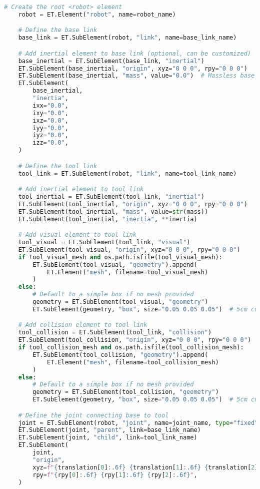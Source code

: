 \begin{lstlisting}[language=python, caption=\raggedright{calibration/sensor\_calibration.py}, frame=single]
    # Create the root <robot> element
    robot = ET.Element("robot", name=robot_name)

    # Define the base link
    base_link = ET.SubElement(robot, "link", name=base_link_name)

    # Add inertial element to base link (optional, can be customized)
    base_inertial = ET.SubElement(base_link, "inertial")
    ET.SubElement(base_inertial, "origin", xyz="0 0 0", rpy="0 0 0")
    ET.SubElement(base_inertial, "mass", value="0.0")  # Massless base
    ET.SubElement(
        base_inertial,
        "inertia",
        ixx="0.0",
        ixy="0.0",
        ixz="0.0",
        iyy="0.0",
        iyz="0.0",
        izz="0.0",
    )

    # Define the tool link
    tool_link = ET.SubElement(robot, "link", name=tool_link_name)

    # Add inertial element to tool link
    tool_inertial = ET.SubElement(tool_link, "inertial")
    ET.SubElement(tool_inertial, "origin", xyz="0 0 0", rpy="0 0 0")
    ET.SubElement(tool_inertial, "mass", value=str(mass))
    ET.SubElement(tool_inertial, "inertia", **inertia)

    # Add visual element to tool link
    tool_visual = ET.SubElement(tool_link, "visual")
    ET.SubElement(tool_visual, "origin", xyz="0 0 0", rpy="0 0 0")
    if tool_visual_mesh and os.path.isfile(tool_visual_mesh):
        ET.SubElement(tool_visual, "geometry").append(
            ET.Element("mesh", filename=tool_visual_mesh)
        )
    else:
        # Default to a simple box if no mesh provided
        geometry = ET.SubElement(tool_visual, "geometry")
        ET.SubElement(geometry, "box", size="0.05 0.05 0.05")  # 5cm cube

    # Add collision element to tool link
    tool_collision = ET.SubElement(tool_link, "collision")
    ET.SubElement(tool_collision, "origin", xyz="0 0 0", rpy="0 0 0")
    if tool_collision_mesh and os.path.isfile(tool_collision_mesh):
        ET.SubElement(tool_collision, "geometry").append(
            ET.Element("mesh", filename=tool_collision_mesh)
        )
    else:
        # Default to a simple box if no mesh provided
        geometry = ET.SubElement(tool_collision, "geometry")
        ET.SubElement(geometry, "box", size="0.05 0.05 0.05")  # 5cm cube

    # Define the joint connecting base to tool
    joint = ET.SubElement(robot, "joint", name=joint_name, type="fixed")
    ET.SubElement(joint, "parent", link=base_link_name)
    ET.SubElement(joint, "child", link=tool_link_name)
    ET.SubElement(
        joint,
        "origin",
        xyz=f"{translation[0]:.6f} {translation[1]:.6f} {translation[2]:.6f}",
        rpy=f"{rpy[0]:.6f} {rpy[1]:.6f} {rpy[2]:.6f}",
    )


\end{lstlisting}
